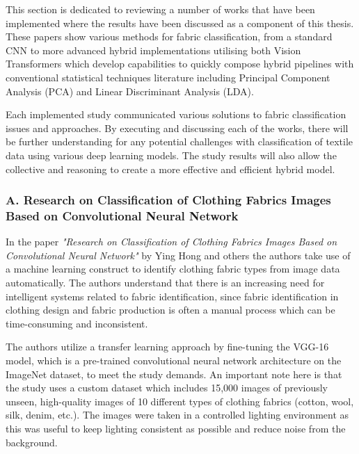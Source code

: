 This section is dedicated to reviewing a number of works that have been implemented where the results have been discussed as a component of this thesis. These papers show various methods for fabric classification, from a standard CNN to more advanced hybrid implementations utilising both Vision Transformers which develop capabilities to quickly compose hybrid pipelines with conventional statistical techniques literature including Principal Component Analysis (PCA) and Linear Discriminant Analysis (LDA).

Each implemented study communicated various solutions to fabric classification issues and approaches. By executing and discussing each of the works, there will be further understanding for any potential challenges with classification of textile data using various deep learning models. The study results will also allow the collective and reasoning to create a more effective and efficient hybrid model.

\subsubsection[A. Research on Classification of Clothing Fabrics Images Based on Convolutional Neural Network]{A. Research on Classification of Clothing Fabrics Images Based on Convolutional Neural Network~\cite{hong2024research}}

In the paper \textit{"Research on Classification of Clothing Fabrics Images Based on Convolutional Neural Network"} by Ying Hong and others the authors take use of a machine learning construct to identify clothing fabric types from image data automatically. The authors understand that there is an increasing need for intelligent systems related to fabric identification, since fabric identification in clothing design and fabric production is often a manual process which can be time-consuming and inconsistent.

The authors utilize a transfer learning approach by fine-tuning the VGG-16 model, which is a pre-trained convolutional neural network architecture on the ImageNet dataset, to meet the study demands. An important note here is that the study uses a custom dataset which includes 15,000 images of previously unseen, high-quality images of 10 different types of clothing fabrics (cotton, wool, silk, denim, etc.). The images were taken in a controlled lighting environment as this was useful to keep lighting consistent as possible and reduce noise from the background.

